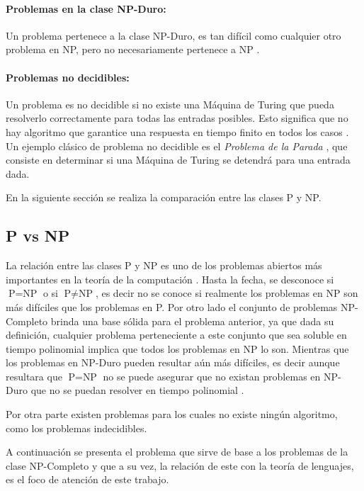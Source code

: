 \documentclass[12pt]{article}
\begin{document}
\paragraph{Problemas en la clase NP-Duro:}
Un problema pertenece a la clase NP-Duro, es tan difícil como cualquier otro problema en NP, pero no 
necesariamente pertenece a NP \cite{authomataTheory}.  

\paragraph{Problemas no decidibles:}
Un problema es no decidible si no existe una Máquina de Turing que pueda resolverlo correctamente para todas las 
entradas posibles. Esto significa que no hay algoritmo que garantice una respuesta en tiempo finito en todos los 
casos \cite{authomataTheory}. Un ejemplo clásico de problema no decidible es el \textit{Problema de la Parada}
\cite{authomataTheory}, que consiste en determinar si una Máquina de Turing se detendrá para una entrada dada.

En la siguiente sección se realiza la comparación entre las clases P y NP.

\subsection{P vs NP}

La relación entre las clases P y NP es uno de los problemas abiertos más importantes en la teoría de la
computación \cite{authomataTheory}. Hasta la fecha, se desconoce si $\text{P} = \text{NP}$ o si $\text{P} \neq \text{NP}$,
es decir no se conoce si realmente los problemas en NP son más difíciles que los problemas en P. Por otro
lado el conjunto de problemas NP-Completo brinda una base sólida para el problema anterior, ya que dada su
definición, cualquier problema perteneciente a este conjunto que sea soluble en tiempo polinomial
implica que todos los problemas en NP lo son. Mientras que los problemas en NP-Duro pueden resultar aún más
difíciles, es decir aunque resultara que $\text{P} = \text{NP}$ no se puede asegurar que no existan problemas
en NP-Duro que no se puedan resolver en tiempo polinomial \cite{authomataTheory}.

Por otra parte existen problemas para los cuales no existe ningún algoritmo, como los problemas indecidibles.

A continuación se presenta el problema que sirve de base a los problemas de la clase NP-Completo y que a su
vez, la relación de este con la teoría de lenguajes, es el foco de atención de este trabajo.
\end{document}
